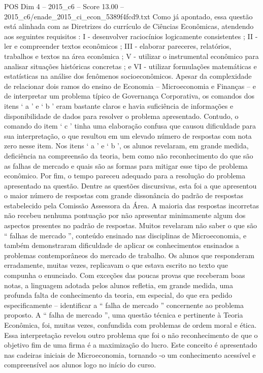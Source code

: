 \begin{textsample}{POS Dim 4 – 2015\_c6 – Score 13.00 – 2015\_c6/enade\_2015\_ci\_econ\_5389f4fcd9.txt}
Como já apontado, essa questão está alinhada com as Diretrizes do currículo de Ciências Econômicas, atendendo aos seguintes requisitos : I - desenvolver raciocínios logicamente consistentes ; II - ler e compreender textos econômicos ; III - elaborar pareceres, relatórios, trabalhos e textos na área econômica ; V - utilizar o instrumental econômico para analisar situações históricas concretas ; e VI - utilizar formulações matemáticas e estatísticas na análise dos fenômenos socioeconômicos.
Apesar da complexidade de relacionar dois ramos do ensino de Economia – Microeconomia e Finanças – e de interpretar um problema típico de Governança Corporativa, os comandos dos itens ‘ a ’ e ‘ b ’ eram bastante claros e havia suficiência de informações e disponibilidade de dados para resolver o problema apresentado.
Contudo, o comando do item ‘ c ’ tinha uma elaboração confusa que causou dificuldade para sua interpretação, o que resultou em um elevado número de respostas com nota zero nesse item.
Nos itens ‘ a ’ e ‘ b ’, os alunos revelaram, em grande medida, deficiência na compreensão da teoria, bem como não reconhecimento do que são as falhas de mercado e quais são as formas para mitigar esse tipo de problema econômico.
Por fim, o tempo pareceu adequado para a resolução do problema apresentado na questão.
Dentre as questões discursivas, esta foi a que apresentou o maior número de respostas com grande dissonância do padrão de respostas estabelecido pela Comissão Assessora da Área.
A maioria das respostas incorretas não recebeu nenhuma pontuação por não apresentar minimamente algum dos aspectos presentes no padrão de respostas.
Muitos revelaram não saber o que são “ falhas de mercado ”, conteúdo ensinado nas disciplinas de Microeconomia, e também demonstraram dificuldade de aplicar os conhecimentos ensinados a problemas contemporâneos do mercado de trabalho.
Os alunos que responderam erradamente, muitas vezes, replicavam o que estava escrito no texto que compunha o enunciado.
Com exceções das poucas provas que receberam boas notas, a linguagem adotada pelos alunos refletia, em grande medida, uma profunda falta de conhecimento da teoria, em especial, do que era pedido especificamente – identificar a “ falha de mercado ” concernente ao problema proposto.
A “ falha de mercado ”, uma questão técnica e pertinente à Teoria Econômica, foi, muitas vezes, confundida com problemas de ordem moral e ética.
Essa interpretação revelou outro problema que foi o não reconhecimento de que o objetivo fim de uma firma é a maximização do lucro.
Este conceito é apresentado nas cadeiras iniciais de Microeconomia, tornando -o um conhecimento acessível e compreensível aos alunos logo no início do curso.

\end{textsample}
